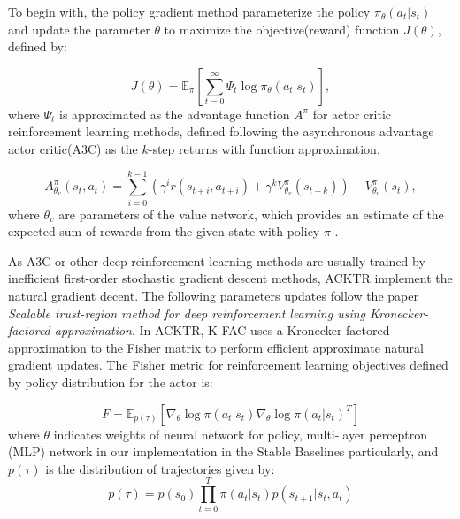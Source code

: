 \documentclass{article}
\begin{document}
To begin with, the policy gradient method parameterize the policy $\pi_\theta(a_t|s_t)$ and update the parameter $\theta$ to maximize the objective(reward) function $J(\theta)$, defined by:

\begin{equation}
    J(\theta)=\mathbb{E}_{\pi}\left[\sum_{t=0}^{\infty} \Psi_{t} \log \pi_{\theta}\left(a_{t}|s_{t}\right)\right],
\end{equation}
where $\Psi_{t}$ is approximated as the advantage function $A^\pi$ for actor critic reinforcement learning methods, defined following the asynchronous advantage actor critic(A3C) as the $k$-step returns with function approximation\cite{A3C}, 

\begin{equation}
    A_{\theta_v}^{\pi}\left(s_{t}, a_{t}\right)=\sum_{i=0}^{k-1}\left(\gamma^{i} r\left(s_{t+i}, a_{t+i}\right)+\gamma^{k} V_{\theta_v}^{\pi}\left(s_{t+k}\right)\right)-V_{\theta_v}^{\pi}\left(s_{t}\right),
\end{equation}
where $\theta_v$ are parameters of the value network, which provides an estimate of the expected sum of rewards from the given state with policy $\pi$ \cite{rl_sutton}. 

As A3C or other deep reinforcement learning methods are usually trained by inefficient first-order stochastic gradient descent methods, ACKTR implement the natural gradient decent. The following parameters updates follow the paper \textit{Scalable trust-region method for deep reinforcement learning using Kronecker-factored approximation}\cite{ACKTR}. In ACKTR, K-FAC uses a Kronecker-factored approximation to the Fisher matrix to perform efficient approximate natural gradient updates. The Fisher metric for reinforcement learning objectives defined by policy distribution for the actor is:

\begin{equation}
    F=\mathbb{E}_{p(\tau)}\left[\nabla_\theta \log \pi\left(a_{t} | s_{t}\right) \nabla_\theta \log \pi\left(a_{t} | s_{t}\right)^{T}\right]
\end{equation}
where $\theta$ indicates weights of neural network for policy, multi-layer perceptron (MLP) network in our implementation in the Stable Baselines particularly, and
$p(\tau)$ is the distribution of trajectories given by:
\begin{equation}
    p(\tau)=p\left(s_{0}\right) \prod_{t=0}^{T} \pi\left(a_{t} | s_{t}\right) p\left(s_{t+1} | s_{t}, a_{t}\right)
\end{equation}
\end{document}
